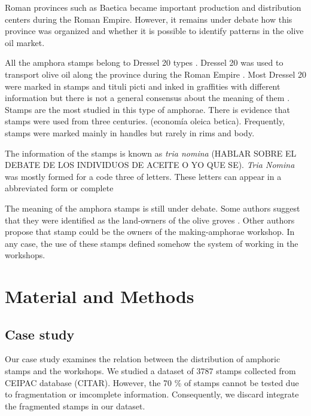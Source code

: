 \documentclass[review]{elsarticle}
\begin{document}
Roman provinces such as Baetica became important production and distribution centers during the Roman Empire. However, it remains under debate how this province was organized and whether it is possible to identify patterns in the olive oil market. 

 




All the amphora stamps belong to Dressel 20 types \citep{martin-kilcher_romischen_1994}. Dressel 20 was used to transport olive oil along the province during the Roman Empire \citep{berni_millet_epigrafianforica_2008}. Most Dressel 20 were marked in stamps and tituli picti and inked in graffities with different information but there is not a general consensus about the meaning of them \citep{rodriguez_baetican_1998}. Stamps are the most studied in this type of amphorae. There is evidence that stamps were used from three centuries. (economía oleica betica). Frequently, stamps were marked mainly in handles but rarely in rims and body. 

The information of the stamps is known as \textit{tria nomina} (HABLAR SOBRE EL DEBATE DE LOS INDIVIDUOS DE ACEITE O YO QUE SE). \textit{Tria Nomina} was mostly formed for a code three of letters. These letters can appear in a abbreviated form or complete \citep{berni_millet_amphora_1996}

The meaning of the amphora stamps is still under debate. Some authors suggest that they were identified as the land-owners of the olive groves \citep{rodriguez_economioleicola_1977}. Other authors propose that stamp could be the owners of the making-amphorae workshop. In any case, the use of these stamps defined somehow the system of working in the workshops. 

\section{Material and Methods}

\subsection{Case study}

Our case study examines the relation between the distribution of amphoric stamps and the workshops. We studied a dataset of 3787 stamps collected from CEIPAC database (CITAR). However, the 70 \% of stamps cannot be tested due to fragmentation or imcomplete information. Consequently, we discard integrate the fragmented stamps in our dataset. 
\end{document}
